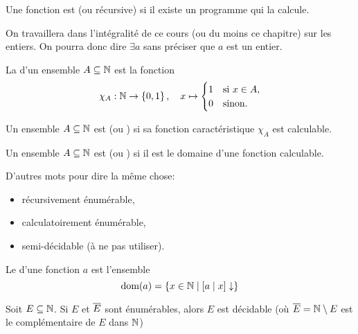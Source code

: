 \begin{definition}
    Une fonction est  (ou récursive) si il existe un programme qui la calcule.
\end{definition}

On travaillera dans l'intégralité de ce cours (ou du moins ce chapitre) sur les entiers. 
On pourra donc dire \(\exists a\) sans préciser que \(a\) est un entier.


\begin{definition}
    La  d'un ensemble \(A\subseteq \mathbb{N}\) est la fonction
    \begin{equation*}
        \chi_A: \mathbb{N} \to \left\{0,1\right\}, \quad x \mapsto \begin{cases}
            1 & \text{si } x\in A, \\
            0 & \text{sinon}.
        \end{cases}
    \end{equation*}
\end{definition}

\begin{definition}
    Un ensemble \(A\subseteq \mathbb{N}\) est  (ou ) si sa fonction caractéristique \(\chi_A\) est calculable.
\end{definition}

\begin{definition}
    Un ensemble \(A\subseteq \mathbb{N}\) est  (ou ) si il est le domaine d'une fonction calculable.

    D'autres mots pour dire la même chose:
    \begin{itemize}
        \item récursivement énumérable,
        \item calculatoirement énumérable,
        \item semi-décidable (à ne pas utiliser).
    \end{itemize}
\end{definition}

\begin{definition}
    Le  d'une fonction \(a\) est l'ensemble
    \begin{equation*}
        \text{dom}(a) = \left\{x\in \mathbb{N} \mid [a\mid x] \downarrow \right\}
    \end{equation*}
\end{definition}

\begin{theorem}[de Post]
    Soit \(E\subseteq \mathbb{N}\). Si \(E\) et \(\overline{E}\) sont énumérables, alors \(E\) est décidable 
    (où \(\overline{E} = \mathbb{N} \setminus E\) est le complémentaire de \(E\) dans \(\mathbb{N}\))
\end{theorem}

